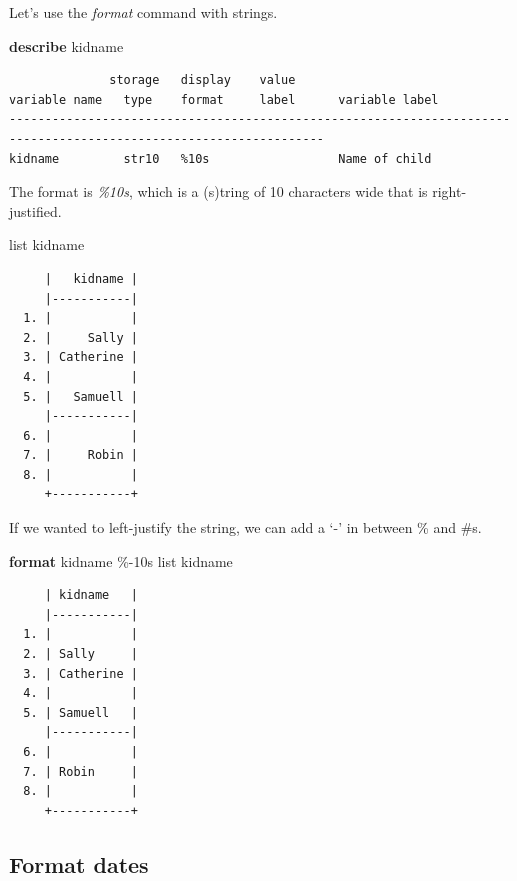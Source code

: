 \documentclass[
]{book}
\newenvironment{Shaded}{\begin{snugshade}}{\end{snugshade}}
\newcommand{\KeywordTok}[1]{\textcolor[rgb]{0.13,0.29,0.53}{\textbf{#1}}}
\newcommand{\NormalTok}[1]{#1}
\newcommand{\OtherTok}[1]{\textcolor[rgb]{0.56,0.35,0.01}{#1}}
\begin{document}
Let's use the \emph{format} command with strings.

\begin{Shaded}
\begin{Highlighting}[]
\KeywordTok{describe}\NormalTok{ kidname}
\end{Highlighting}
\end{Shaded}

\begin{verbatim}
              storage   display    value
variable name   type    format     label      variable label
------------------------------------------------------------------------------------------------------------------
kidname         str10   %10s                  Name of child
\end{verbatim}

The format is \emph{\%10s}, which is a (s)tring of 10 characters wide that is right-justified.

\begin{Shaded}
\begin{Highlighting}[]
\OtherTok{list}\NormalTok{ kidname}
\end{Highlighting}
\end{Shaded}

\begin{verbatim}
     |   kidname |
     |-----------|
  1. |           |
  2. |     Sally |
  3. | Catherine |
  4. |           |
  5. |   Samuell |
     |-----------|
  6. |           |
  7. |     Robin |
  8. |           |
     +-----------+
\end{verbatim}

If we wanted to left-justify the string, we can add a `-' in between \% and \#s.

\begin{Shaded}
\begin{Highlighting}[]
\KeywordTok{format}\NormalTok{ kidname \%{-}10s}
\OtherTok{list}\NormalTok{ kidname}
\end{Highlighting}
\end{Shaded}

\begin{verbatim}
     | kidname   |
     |-----------|
  1. |           |
  2. | Sally     |
  3. | Catherine |
  4. |           |
  5. | Samuell   |
     |-----------|
  6. |           |
  7. | Robin     |
  8. |           |
     +-----------+
\end{verbatim}

\subsection{Format dates}\label{format-dates}
\end{document}
